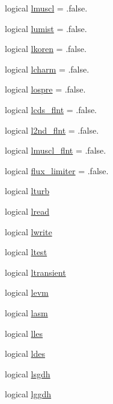 \begin{DoxyCompactItemize}
\item 
logical \hyperlink{classparameters_ac472cfbe394381ad9a540824513667bb}{lmuscl} = .false.
\item 
logical \hyperlink{classparameters_a9adfd620c1136668b1f1a0943aed3047}{lumist} = .false.
\item 
logical \hyperlink{classparameters_af06fe1b78bc52f0f703585f6d2529009}{lkoren} = .false.
\item 
logical \hyperlink{classparameters_a9edc983c42d06402160c1965f9de19ef}{lcharm} = .false.
\item 
logical \hyperlink{classparameters_a9d1034aed7c54a09d2f7cefdbfc68589}{lospre} = .false.
\item 
logical \hyperlink{classparameters_a248c2e616b515c73adc698dcf0abe4d5}{lcds\-\_\-flnt} = .false.
\item 
logical \hyperlink{classparameters_a33714dd59ea2866514d6ba30877c0ae6}{l2nd\-\_\-flnt} = .false.
\item 
logical \hyperlink{classparameters_a71ca60464c225940e4bc3847b7996417}{lmuscl\-\_\-flnt} = .false.
\item 
logical \hyperlink{classparameters_adde0ca892151fbaee52e0b6024c96f57}{flux\-\_\-limiter} = .false.
\item 
logical \hyperlink{classparameters_a1e50121d0b48c15ccef9ed7f5873125c}{lturb}
\item 
logical \hyperlink{classparameters_a0f741689dbfc01724c2fc9ce6ce11d54}{lread}
\item 
logical \hyperlink{classparameters_ae27d6e1c2f59cc8138e9b227bac7e718}{lwrite}
\item 
logical \hyperlink{classparameters_a1fd26ff89bde7c0b0eb3d6794bf2ce26}{ltest}
\item 
logical \hyperlink{classparameters_a4a4095cc702f9834fdb4515a638720c2}{ltransient}
\item 
logical \hyperlink{classparameters_abc9929b5c7137ac29bc2448046c10558}{levm}
\item 
logical \hyperlink{classparameters_a000fbbafc058baa162d9b5d6451d5527}{lasm}
\item 
logical \hyperlink{classparameters_a9cf54281237866a8b15f4ba364b1635f}{lles}
\item 
logical \hyperlink{classparameters_aacfddcba3237640f9afec331234aee6e}{ldes}
\item 
logical \hyperlink{classparameters_a387d7fbc00037b6914a5469f100f750d}{lsgdh}
\item 
logical \hyperlink{classparameters_a1b599778ad03bfd0868f3d0afd36921d}{lggdh}

\end{DoxyCompactItemize}
